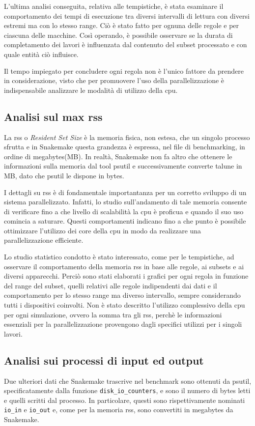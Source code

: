 L'ultima analisi conseguita, relativa alle tempistiche, è stata esaminare il comportamento dei tempi di esecuzione tra diversi intervalli di lettura con diversi estremi ma con lo stesso range.
Ciò è stato fatto per ognuna delle regole e per ciascuna delle macchine.
Così operando, è possibile osservare se la durata di completamento dei lavori è influenzata dal contenuto del subset processato e con quale entità ciò influisce.

Il tempo impiegato per concludere ogni regola non è l'unico fattore da prendere in considerazione, visto che per promuovere l'uso della parallelizzazione è indispensabile analizzare le modalità di utilizzo della cpu. 

\subsection{Analisi sul max rss}
La rss o \textit{Resident Set Size} è la memoria fisica, non estesa, che un singolo processo sfrutta e in Snakemake questa grandezza è espressa, nel file di benchmarking, in ordine di megabytes(MB). 
In realtà, Snakemake non fa altro che ottenere le informazioni sulla memoria dal tool psutil e successivamente converte talune in MB, dato che psutil le dispone in bytes.

I dettagli su rss è di fondamentale importantanza per un corretto sviluppo di un sistema parallelizzato.
Infatti, lo studio sull'andamento di tale memoria consente di verificare fino a che livello di scalabilità la cpu è proficua e quando il suo uso comincia a saturare.
Questi comportamenti indicano fino a che punto è possibile ottimizzare l'utilizzo dei core della cpu in modo da realizzare una parallelizzazione efficiente.

Lo studio statistico condotto è stato interessato, come per le tempistiche, ad osservare il comportamento della memoria rss in base alle regole, ai subsets e ai diversi apparecchi.
Perciò sono stati elaborati i grafici per ogni regola in funzione del range del subset, quelli relativi alle regole indipendenti dai dati e il comportamento per lo stesso range ma diverso intervallo, sempre considerando tutti i dispositivi coinvolti.
Non è stato descritto l'utilizzo complessivo della cpu per ogni simulazione, ovvero la somma tra gli rss, perchè le informazioni essenziali per la parallelizzazione provengono dagli specifici utilizzi per i singoli lavori. 
    

\subsection{Analisi sui processi di input ed output} 
Due ulteriori dati che Snakemake trascrive nel benchmark sono ottenuti da psutil, specificatamente dalla funzione \verb!disk_io_counters!, e sono il numero di bytes letti e quelli scritti dal processo.
In particolare, questi sono rispettivamente nominati \verb!io_in! e \verb!io_out! e, come per la memoria rss, sono convertiti in megabytes da Snakemake. 

